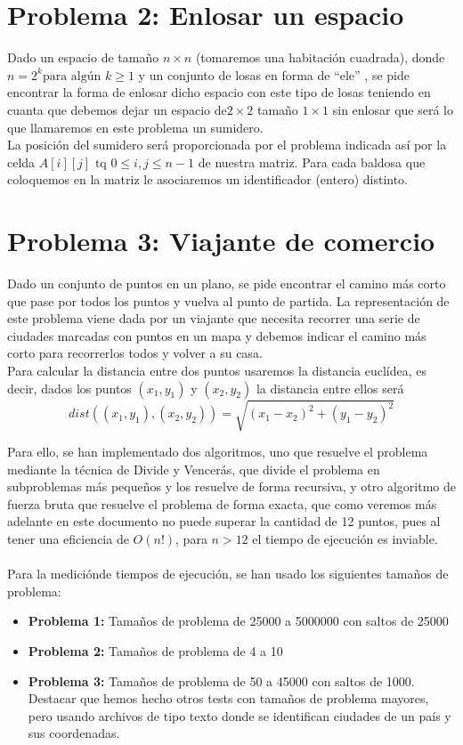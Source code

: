 \documentclass[11pt,openany]{book}
\begin{document}
\section{Problema 2: Enlosar un espacio}
Dado un espacio de tamaño $n \times n$ (tomaremos una habitación cuadrada), donde $n=2^k \text{para algún } k \geq 1$ y un conjunto de losas en forma de \enquote{ele} , se pide encontrar la forma de enlosar
dicho espacio con este tipo de losas teniendo en cuanta que debemos dejar un espacio de$2 \times 2$ tamaño $1 \times 1$ sin enlosar que será lo
que llamaremos en este problema un sumidero. \\
La posición del sumidero será proporcionada por el problema indicada así por la celda $A[i][j] \text{ tq } 0 \leq i,j \leq n-1$ de
nuestra matriz. Para cada baldosa que coloquemos en la matriz le asociaremos un identificador (entero) distinto.
\section{Problema 3: Viajante de comercio}
Dado un conjunto de puntos en un plano, se pide encontrar el camino más corto que pase por todos los puntos y vuelva al punto de partida.
La representación de este problema viene dada por un viajante que necesita recorrer una serie de ciudades marcadas con puntos en un mapa y debemos
indicar el camino más corto para recorrerlos todos y volver a su casa. \\
Para calcular la distancia entre dos puntos usaremos la distancia euclídea, es decir,
dados los puntos $(x_1,y_1)$ y $(x_2,y_2)$ la distancia entre ellos será
\begin{equation*}
      dist((x_1,y_1), (x_2, y_2))=\sqrt{(x_1-x_2)^2+(y_1-y_2)^2}
\end{equation*}

Para ello, se han implementado dos algoritmos, uno que resuelve el problema
mediante la técnica de Divide y Vencerás, que divide el problema en subproblemas más pequeños y los resuelve de forma recursiva, y otro
algoritmo de fuerza bruta que resuelve el problema de forma exacta, que como veremos más adelante en este documento no puede superar la cantidad de 12 puntos, pues
al tener una eficiencia de $O(n!)$, para $n>12$ el tiempo de ejecución es inviable. \\ \\

Para la mediciónde tiempos de ejecución, se han usado los siguientes tamaños de problema:
\begin{itemize}
      \item \textbf{Problema 1:} Tamaños de problema de 25000 a 5000000 con saltos de 25000
      \item \textbf{Problema 2:} Tamaños de problema de 4 a 10
      \item \textbf{Problema 3:} Tamaños de problema de 50 a 45000 con saltos de 1000. Destacar que hemos hecho otros tests con tamaños de problema mayores,
            pero usando archivos de tipo texto donde se identifican ciudades de un país y sus coordenadas.
\end{itemize}
\end{document}
